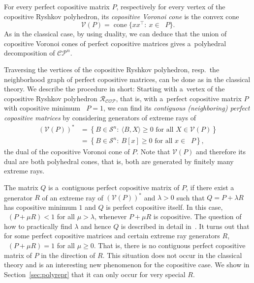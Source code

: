\documentclass{commat}
\newcommand{\sR}{\mathcal{R}}
\DeclareMathOperator{\cone}{cone}
\newcommand{\sn}{{\mathcal{S}}^{n}}
\newcommand{\cop}{{\mathcal{COP}}}
\newcommand{\cpn}{{\mathcal{CP}}^{n}}
\DeclareMathOperator{\minC}{min_{\cop}}
\DeclareMathOperator{\MinC}{Min_{\cop}}
\begin{document}
For every perfect copositive matrix $P$, respectively for every vertex of the copositive
Ryshkov polyhedron, its \emph{copositive Voronoi cone} is the convex cone
\[
	\mathcal{V}(P) = \cone\big\{ xx^\intercal :\ x\in\MinC P \big\}.
\]
As in the classical case, by using duality, we can deduce that the union of copositive Voronoi
cones of perfect copositive matrices gives a~polyhedral decomposition of \(\cpn \).

Traversing the vertices of the copositive Ryshkov polyhedron,
resp.\ the neighborhood graph of perfect copositive matrices,
can be done as in the classical theory.
We describe the procedure in short:
Starting with a~vertex of the copositive Ryshkov polyhedron \(\sR_\cop \),
that is, with a~perfect copositive matrix $P$ with copositive minimum \(\minC P=1 \),
we can find its \emph{contiguous (neighboring) perfect copositive matrices}
by considering generators of extreme rays of
\begin{align*}
	{(\mathcal{V}(P))}^*
    & = \left\{ B\in\sn:\ \langle B, X \rangle\geq 0 \text{ for all } X\in\mathcal{V}(P) \right\} \\
	& = \left\{ B\in\sn:\ B[x]\geq 0 \text{ for all } x\in\MinC P \right\},
\end{align*}
the dual of the copositive Voronoi cone of $P$.
Note that \(\mathcal{V}(P)\) and therefore its dual are both polyhedral cones,
that is, both are generated by finitely many extreme rays.


The matrix $Q$ is a~contiguous perfect copositive matrix of $P$, if there exist
a generator $R$ of an extreme ray of \({(\mathcal{V}(P))}^* \) and \(\lambda>0 \)
such that \(Q=P+\lambda R \) has copositive minimum $1$
and $Q$ is perfect copositive itself.
In this case, \(\minC(P+\mu R)<1 \) for all \(\mu>\lambda \), whenever \(P+\mu R \) is copositive.
The question of how to practically find \(\lambda \) and hence $Q$ is described in detail in~\cite[Section~3]{dsv-2021}.
It turns out that for some perfect copositive matrices and certain extreme ray generators $R$,
\(\minC(P+\mu R)=1 \) for all \(\mu\geq 0 \).
That is, there is no contiguous perfect copositive matrix of $P$ in the direction of $R$.
This situation does not occur in the classical theory and is an interesting new phenomenon
for the copositive case.
We show in Section~\ref{sec:polyrepr} that it can only occur for very special $R$.
\end{document}
